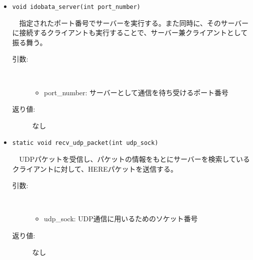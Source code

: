 \documentclass[uplatex,dvipdfmx,11pt,a4paper]{jsarticle} %
\begin{document}
\begin{itemize}

    \item {\tt void idobata\_server(int port\_number)}

        　指定されたポート番号でサーバーを実行する。また同時に、そのサーバーに接続するクライアントも実行することで、サーバー兼クライアントとして振る舞う。
        \begin{description}
            \item[引数:] \ 

                \begin{itemize}
                        \item port\_number: サーバーとして通信を待ち受けるポート番号
                \end{itemize}
            \item[返り値:] なし
            \newline
        \end{description}

    \item {\tt static void recv\_udp\_packet(int udp\_sock)}

        　UDPパケットを受信し、パケットの情報をもとにサーバーを検索しているクライアントに対して、HEREパケットを送信する。
        \begin{description}
            \item[引数:] \ 

                \begin{itemize}
                        \item udp\_sock: UDP通信に用いるためのソケット番号
                \end{itemize}
            \item[返り値:] なし
            \newline
        \end{description}


\end{itemize}
\end{document}

